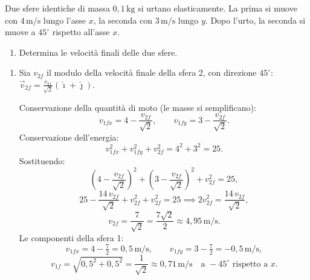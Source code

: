 \begin{question}[ID=4.2, subtitle={Velocità finali in urto elastico piano tra sfere identiche}, tags={urti nel piano, conservazione vettoriale}, difficulty=media]
Due sfere identiche di massa \(0{,}1 \, \text{kg}\) si urtano elasticamente. La prima si muove con \(4 \, \text{m/s}\) lungo l'asse \(x\), la seconda con \(3 \, \text{m/s}\) lungo \(y\). Dopo l'urto, la seconda si muove a \(45^\circ\) rispetto all'asse \(x\).
\begin{enumerate}
    \item Determina le velocità finali delle due sfere.
\end{enumerate}
\begin{solution}
    \begin{enumerate}
        \item Sia \(v_{2f}\) il modulo della velocità finale della sfera 2, con direzione \(45^\circ\):
        \(\vec{v}_{2f} = \frac{v_{2f}}{\sqrt{2}}(\hat{\imath}+\hat{\jmath})\).

        Conservazione della quantità di moto (le masse si semplificano):
        \[
            v_{1fx} = 4 - \frac{v_{2f}}{\sqrt{2}}, \qquad v_{1fy} = 3 - \frac{v_{2f}}{\sqrt{2}}.
        \]
        Conservazione dell'energia:
        \[
            v_{1fx}^2 + v_{1fy}^2 + v_{2f}^2 = 4^2 + 3^2 = 25.
        \]
        Sostituendo:
        \[
            \left(4 - \frac{v_{2f}}{\sqrt{2}}\right)^2 + \left(3 - \frac{v_{2f}}{\sqrt{2}}\right)^2 + v_{2f}^2 = 25,
        \]
        \[
            25 - \frac{14\,v_{2f}}{\sqrt{2}} + v_{2f}^2 + v_{2f}^2 = 25 \implies 2v_{2f}^2 = \frac{14\,v_{2f}}{\sqrt{2}},
        \]
        \[
            v_{2f} = \frac{7}{\sqrt{2}} = \frac{7\sqrt{2}}{2} \approx 4{,}95 \, \text{m/s}.
        \]
        Le componenti della sfera 1:
        \[
            v_{1fx} = 4 - \tfrac{7}{2} = 0{,}5 \, \text{m/s}, \qquad v_{1fy} = 3 - \tfrac{7}{2} = -0{,}5 \, \text{m/s},
        \]
        \[
            v_{1f} = \sqrt{0{,}5^2 + 0{,}5^2} = \frac{1}{\sqrt{2}} \approx 0{,}71 \, \text{m/s} \quad \text{a } -45^\circ \text{ rispetto a } x.
        \]
    \end{enumerate}
\end{solution}
\end{question}


